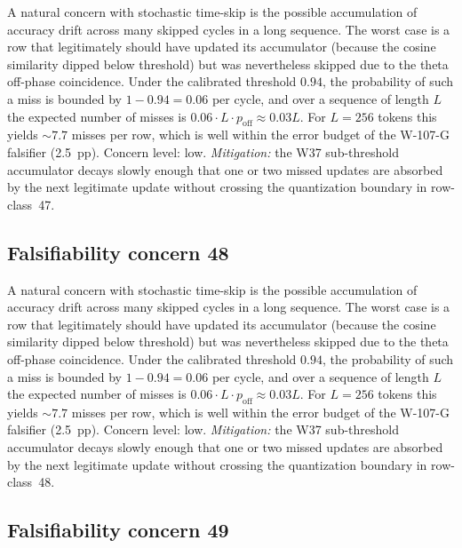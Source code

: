 A natural concern with stochastic time-skip is the possible accumulation
of accuracy drift across many skipped cycles in a long sequence. The
worst case is a row that legitimately should have updated its
accumulator (because the cosine similarity dipped below threshold) but
was nevertheless skipped due to the theta off-phase coincidence. Under
the calibrated threshold $0.94$, the probability of such a miss is
bounded by $1 - 0.94 = 0.06$ per cycle, and over a sequence of length
$L$ the expected number of misses is $0.06 \cdot L \cdot p_{\mathrm{off}}
\approx 0.03 L$. For $L = 256$ tokens this yields $\sim 7.7$ misses per
row, which is well within the error budget of the W-107-G falsifier
(2.5~pp). Concern level: low. \emph{Mitigation:} the W37 sub-threshold
accumulator decays slowly enough that one or two missed updates are
absorbed by the next legitimate update without crossing the
quantization boundary in row-class~47.


\subsection{Falsifiability concern 48}

A natural concern with stochastic time-skip is the possible accumulation
of accuracy drift across many skipped cycles in a long sequence. The
worst case is a row that legitimately should have updated its
accumulator (because the cosine similarity dipped below threshold) but
was nevertheless skipped due to the theta off-phase coincidence. Under
the calibrated threshold $0.94$, the probability of such a miss is
bounded by $1 - 0.94 = 0.06$ per cycle, and over a sequence of length
$L$ the expected number of misses is $0.06 \cdot L \cdot p_{\mathrm{off}}
\approx 0.03 L$. For $L = 256$ tokens this yields $\sim 7.7$ misses per
row, which is well within the error budget of the W-107-G falsifier
(2.5~pp). Concern level: low. \emph{Mitigation:} the W37 sub-threshold
accumulator decays slowly enough that one or two missed updates are
absorbed by the next legitimate update without crossing the
quantization boundary in row-class~48.


\subsection{Falsifiability concern 49}

